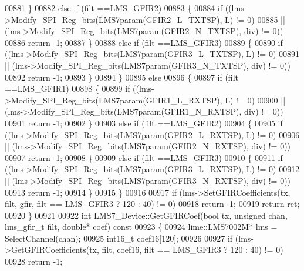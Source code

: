\begin{DoxyCode}
{{{00881       \}
00882       \textcolor{keywordflow}{else} \textcolor{keywordflow}{if} (filt ==LMS_GFIR2)
00883       \{
00884           \textcolor{keywordflow}{if} ((lms->Modify_SPI_Reg_bits(LMS7param(GFIR2_L_TXTSP), L) != 0)
00885               || (lms->Modify_SPI_Reg_bits(LMS7param(GFIR2_N_TXTSP), div) != 0))
00886               \textcolor{keywordflow}{return} -1;
00887       \}
00888       \textcolor{keywordflow}{else} \textcolor{keywordflow}{if} (filt ==LMS_GFIR3)
00889       \{
00890           \textcolor{keywordflow}{if} ((lms->Modify_SPI_Reg_bits(LMS7param(GFIR3_L_TXTSP), L) != 0)
00891               || (lms->Modify_SPI_Reg_bits(LMS7param(GFIR3_N_TXTSP), div) != 0))
00892               \textcolor{keywordflow}{return} -1;
00893       \}
00894     \}
00895     \textcolor{keywordflow}{else}
00896     \{
00897       \textcolor{keywordflow}{if} (filt ==LMS_GFIR1)
00898       \{
00899           \textcolor{keywordflow}{if} ((lms->Modify_SPI_Reg_bits(LMS7param(GFIR1_L_RXTSP), L) != 0)
00900               || (lms->Modify_SPI_Reg_bits(LMS7param(GFIR1_N_RXTSP), div) != 0))
00901             \textcolor{keywordflow}{return} -1;
00902       \}
00903       \textcolor{keywordflow}{else} \textcolor{keywordflow}{if} (filt ==LMS_GFIR2)
00904       \{
00905           \textcolor{keywordflow}{if} ((lms->Modify_SPI_Reg_bits(LMS7param(GFIR2_L_RXTSP), L) != 0)
00906               || (lms->Modify_SPI_Reg_bits(LMS7param(GFIR2_N_RXTSP), div) != 0))
00907             \textcolor{keywordflow}{return} -1;
00908       \}
00909       \textcolor{keywordflow}{else} \textcolor{keywordflow}{if} (filt ==LMS_GFIR3)
00910       \{
00911           \textcolor{keywordflow}{if} ((lms->Modify_SPI_Reg_bits(LMS7param(GFIR3_L_RXTSP), L) != 0)
00912               || (lms->Modify_SPI_Reg_bits(LMS7param(GFIR3_N_RXTSP), div) != 0))
00913             \textcolor{keywordflow}{return} -1;
00914       \}
00915     \}
00916 
00917     \textcolor{keywordflow}{if} (lms->SetGFIRCoefficients(tx, filt, gfir, filt == LMS_GFIR3 ? 120 : 40) != 0)
00918        \textcolor{keywordflow}{return} -1;
00919    \textcolor{keywordflow}{return} ret;
00920 \}
00921 
00922 \textcolor{keywordtype}{int} LMS7_Device::GetGFIRCoef(\textcolor{keywordtype}{bool} tx, \textcolor{keywordtype}{unsigned} chan, lms_gfir_t filt, \textcolor{keywordtype}{double}* 
      coef)\textcolor{keyword}{ const}
00923 \textcolor{keyword}{}\{
00924     lime::LMS7002M* lms = SelectChannel(chan);
00925     int16\_t coef16[120];
00926 
00927     \textcolor{keywordflow}{if} (lms->GetGFIRCoefficients(tx, filt, coef16, filt == LMS_GFIR3 ? 120 : 40) != 0)
00928         \textcolor{keywordflow}{return} -1;
}}}
\end{DoxyCode}
